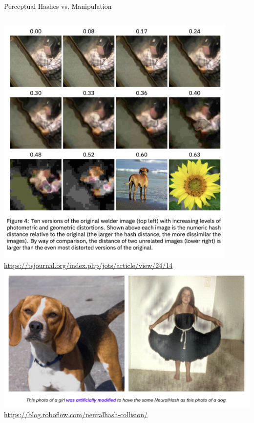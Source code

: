 \documentclass[nobackground,dvipsnames,table,aspectratio=169]{beamer}
\begin{document}
\begin{frame}{Perceptual Hashes vs. Manipulation}
    \begin{columns}
            \includegraphics[width=0.9\textwidth]{perceptual-hashes-vs-manipulation-1}
            \tiny
            \url{https://tsjournal.org/index.php/jots/article/view/24/14}
            \includegraphics[width=\textwidth]{perceptual-hashes-vs-manipulation-2}
            \tiny
            \url{https://blog.roboflow.com/neuralhash-collision/}
    \end{columns}
\end{frame}
\end{document}
